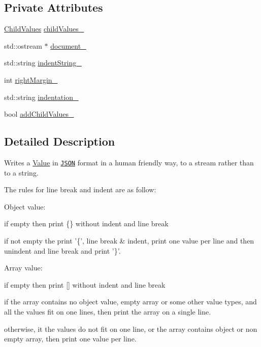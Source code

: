 \subsection*{Private Attributes}
\begin{DoxyCompactItemize}
\item 
\hyperlink{classJson_1_1StyledStreamWriter_ad0e42dda934aaee87fa9434c30186a9b}{Child\-Values} \hyperlink{classJson_1_1StyledStreamWriter_aafd62e00a401df73fcacb2e410114b3d}{child\-Values\-\_\-}
\item 
std\-::ostream $\ast$ \hyperlink{classJson_1_1StyledStreamWriter_a776530a811e75a819ef05dd8725da4e6}{document\-\_\-}
\item 
std\-::string \hyperlink{classJson_1_1StyledStreamWriter_af9ebd4487e7f69bd1074e6ce29c7cf02}{indent\-String\-\_\-}
\item 
int \hyperlink{classJson_1_1StyledStreamWriter_a67fdaa6758885f082b6a7ede52b0ab91}{right\-Margin\-\_\-}
\item 
std\-::string \hyperlink{classJson_1_1StyledStreamWriter_a58dc0eaf85c58b83d19d6bba8eead27d}{indentation\-\_\-}
\item 
bool \hyperlink{classJson_1_1StyledStreamWriter_a4e4bb7fc223b2652b72b523b1ce414fa}{add\-Child\-Values\-\_\-}
\end{DoxyCompactItemize}


\subsection{Detailed Description}
Writes a \hyperlink{classJson_1_1Value}{Value} in \href{http://www.json.org}{\tt J\-S\-O\-N} format in a human friendly way, to a stream rather than to a string. 

The rules for line break and indent are as follow\-:
\begin{DoxyItemize}
\item Object value\-:
\begin{DoxyItemize}
\item if empty then print \{\} without indent and line break
\item if not empty the print '\{', line break \& indent, print one value per line and then unindent and line break and print '\}'.
\end{DoxyItemize}
\item Array value\-:
\begin{DoxyItemize}
\item if empty then print \mbox{[}\mbox{]} without indent and line break
\item if the array contains no object value, empty array or some other value types, and all the values fit on one lines, then print the array on a single line.
\item otherwise, it the values do not fit on one line, or the array contains object or non empty array, then print one value per line.
\end{DoxyItemize}
\end{DoxyItemize}

